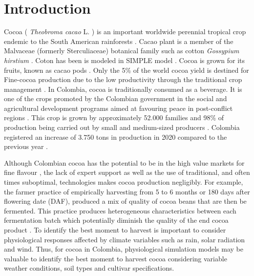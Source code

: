 \documentclass[gene,journal,article,submit,moreauthors,pdftex]{Definitions/mdpi}
\begin{document}

\section{Introduction}

Cocoa ( \textit{Theobroma cacao }L. ) is an important worldwide perennial tropical crop endemic to the South American rainforests \citep{zuidema2005, motamayor2002, argout2011, Rodriguez2019}. Cacao plant is a member of the Malvaceae (formerly Sterculiaceae)  botanical family such as  cotton \textit{ Gossypium hirstium} \citep{Nix2017cotton}. Coton has been is modeled in SIMPLE model \citep{Zao2019simple}. Cocoa is grown for its fruits, known as cacao pods \citep{ Niemenak2010, suarez2021}. Only the 5\% of the world cocoa yield is destined for Fine-cocoa production due to the low productivity through  the traditional crop management \citep{argout2011}.  In Colombia, cocoa  is  traditionally  consumed  as  a  beverage. It is one of the crops promoted by the Colombian government in the social and agricultural development  programs aimed at favouring peace in post-conflict regions \citep{Rodriguez2019, Abbott2019}. This crop is grown by approximately 52.000 families \citep{Gutierrez2020} and 98\% of production being carried out by small and medium-sized producers \citep{Garcia2014, Escobar2020}. Colombia registered an increase of 3.750 tons in production in 2020 compared to the previous year \citep{lamos2020}. 

Although Colombian cocoa has the potential to be in the high value markets for fine flavour \citep{Escobar2020}, {\color{red} the lack of expert support as well as the use of traditional, and often times suboptimal, technologies makes cocoa production negligibly. For example, the farmer practice of empirically harvesting from 5 to 6 months or {\color{olive} 180 days } after flowering date (DAF), produced a mix of quality of cocoa beans that are then be fermented. This practice produces heterogeneous characteristics between each fermentation batch which potentially diminish the quality of the end cocoa product} \citep{Escobar2021}. To identify the best moment to harvest is important to consider physiological responses affected by climate variables such as rain, solar radiation and wind.  Thus,  for cocoa in Colombia, physiological simulation models may be valuable to identify the best moment to harvest cocoa considering variable weather conditions, soil types and cultivar specifications. 
\end{document}
